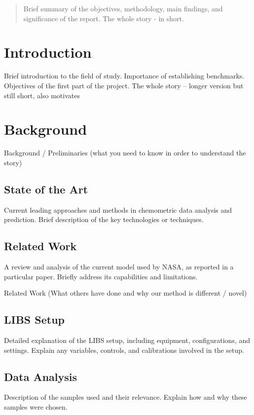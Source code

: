 \begin{abstract}
     Brief summary of the objectives, methodology, main findings, and significance of the report. The whole story - in short.
\end{abstract}



\section{Introduction}
Brief introduction to the field of study.
Importance of establishing benchmarks.
Objectives of the first part of the project.
The whole story – longer version but still short, also motivates

\section{Background}
Background / Preliminaries (what you need to know in order to understand the story)
\subsection{State of the Art}
Current leading approaches and methods in chemometric data analysis and prediction.
Brief description of the key technologies or techniques.

\subsection{Related Work}
A review and analysis of the current model used by NASA, as reported in a particular paper.
Briefly address its capabilities and limitations.

Related Work (What others have done and why our method is different / novel)

\subsection{LIBS Setup}
Detailed explanation of the LIBS setup, including equipment, configurations, and settings.
Explain any variables, controls, and calibrations involved in the setup.

\subsection{Data Analysis}
Description of the samples used and their relevance.
Explain how and why these samples were chosen.

